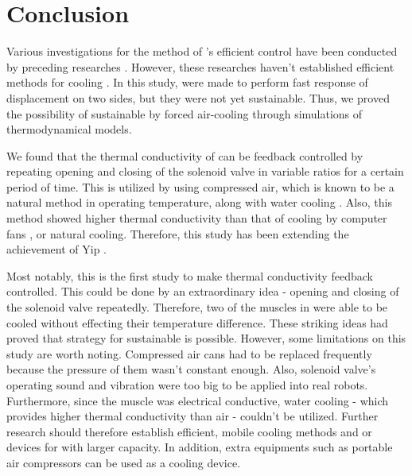 \section{Conclusion}
Various investigations for the method of \scpnospace's efficient control have been conducted by preceding researches \cite{haines,mirvakili,yip}. %
However, these researches haven't established efficient methods for cooling \scpnospace. %
In this study, \antas were made to perform fast response of displacement on two sides, but they were not yet sustainable. Thus, we proved the possibility of sustainable \apc by forced air-cooling through simulations of thermodynamical models. %

We found that the thermal conductivity of \scp can be feedback controlled by repeating opening and closing of the solenoid valve in variable ratios for a certain period of time. %
This is utilized by using compressed air, which is known to be a natural method in operating temperature, along with water cooling \cite{madden}.
Also, this method showed higher thermal conductivity than that of cooling by computer fans \cite{yip}, or natural cooling.
Therefore, this study has been extending the achievement of Yip \etal.

Most notably, this is the first study to make thermal conductivity feedback controlled. 
This could be done by an extraordinary idea - opening and closing of the solenoid valve repeatedly.
Therefore, two of the muscles in \anta were able to be cooled without effecting their temperature difference.
These striking ideas had proved that strategy for sustainable \apc is possible.
However, some limitations on this study are worth noting. 
Compressed air cans had to be replaced frequently because the pressure of them wasn't constant enough. 
Also, solenoid valve's operating sound and vibration were too big to be applied into real robots.
Furthermore, since the muscle was electrical conductive, water cooling - which provides higher thermal conductivity than air \cite{finger} - couldn't be utilized.
Further research should therefore establish efficient, mobile cooling methods and or devices for \scps with larger capacity. 
In addition, extra equipments such as portable air compressors can be used as a cooling device.



